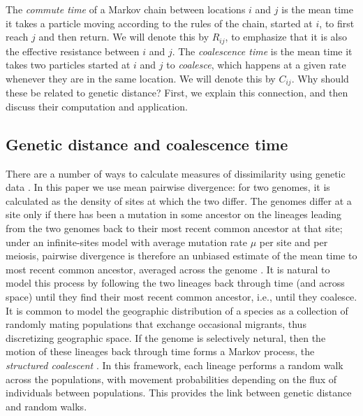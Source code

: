 \documentclass{article}
\begin{document}
The \emph{commute time} of a Markov chain between locations $i$ and $j$
is the mean time it takes a particle moving according to the rules of the chain, 
started at $i$, to first reach $j$ and then return.
We will denote this by $R_{ij}$, to emphasize that it is also the effective resistance
between $i$ and $j$.
The \emph{coalescence time} is the mean time it takes two particles started at $i$ and $j$
to \emph{coalesce},
which happens at a given rate whenever they are in the same location.
We will denote this by $C_{ij}$.
Why should these be related to genetic distance? 
First, we explain this connection,
and then discuss their computation and application.


\subsection*{Genetic distance and coalescence time}

There are a number of ways to calculate measures of dissimilarity using genetic data \citep{distances}.
In this paper we use mean pairwise divergence:
for two genomes, it is calculated as the density of sites at which the two differ.
The genomes differ at a site only if there has been a mutation in some ancestor on the lineages leading
from the two genomes back to their most recent common ancestor at that site;
under an infinite-sites model with average mutation rate $\mu$ per site and per meiosis,
pairwise divergence is therefore an unbiased estimate of the mean time to most recent common ancestor,
averaged across the genome \citep{hudson2007variance,ralphXX}.
It is natural to model this process by following the two lineages back through time
(and across space)
until they find their most recent common ancestor,
i.e., until they coalesce.
It is common to model the geographic distribution of a species
as a collection of randomly mating populations
that exchange occasional migrants,
thus discretizing geographic space.
If the genome is selectively netural,
then the motion of these lineages back through time
forms a Markov process, the \emph{structured coalescent} \citep{wakeley2005coalescent}.
In this framework, each lineage performs a random walk across the populations,
with movement probabilities depending on the flux of individuals between populations.
This provides the link between genetic distance and random walks.
\end{document}
